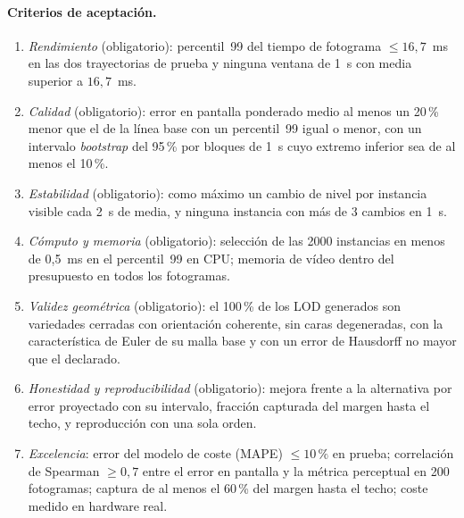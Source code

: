 \paragraph{Criterios de aceptación.}
\begin{enumerate}[label=B\arabic*.]
  \item \emph{Rendimiento} (obligatorio): percentil~99 del tiempo de fotograma $\le 16{,}7$~ms en las dos trayectorias de prueba y ninguna ventana de 1~s con media superior a $16{,}7$~ms.
  \item \emph{Calidad} (obligatorio): error en pantalla ponderado medio al menos un 20\,\% menor que el de la línea base con un percentil~99 igual o menor, con un intervalo \emph{bootstrap} del 95\,\% por bloques de 1~s cuyo extremo inferior sea de al menos el 10\,\%.
  \item \emph{Estabilidad} (obligatorio): como máximo un cambio de nivel por instancia visible cada 2~s de media, y ninguna instancia con más de 3 cambios en 1~s.
  \item \emph{Cómputo y memoria} (obligatorio): selección de las 2000 instancias en menos de 0{,}5~ms en el percentil~99 en CPU; memoria de vídeo dentro del presupuesto en todos los fotogramas.
  \item \emph{Validez geométrica} (obligatorio): el 100\,\% de los LOD generados son variedades cerradas con orientación coherente, sin caras degeneradas, con la característica de Euler de su malla base y con un error de Hausdorff no mayor que el declarado.
  \item \emph{Honestidad y reproducibilidad} (obligatorio): mejora frente a la alternativa por error proyectado con su intervalo, fracción capturada del margen hasta el techo, y reproducción con una sola orden.
  \item \emph{Excelencia}: error del modelo de coste (MAPE) $\le 10\,\%$ en prueba; correlación de Spearman $\ge 0{,}7$ entre el error en pantalla y la métrica perceptual en 200 fotogramas; captura de al menos el 60\,\% del margen hasta el techo; coste medido en hardware real.
\end{enumerate}


